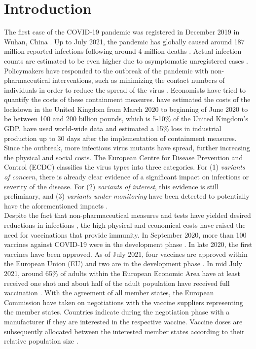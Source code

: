 \section{Introduction}
The first case of the COVID-19 pandemic was registered in December 2019 in Wuhan, China \citep{Hui.2020}. Up to July 2021, the pandemic has globally caused around 187 million reported infections following around 4 million deaths \citep{ecdc.2021a}. Actual infection counts are estimated to be even higher due to asymptomatic unregistered cases \citep{Byambasuren.2020}. Policymakers have responded to the outbreak of the pandemic with non-pharmaceutical interventions, such as minimizing the contact numbers of individuals in order to reduce the spread of the virus \citep{Gabler.2021}.  Economists have tried to quantify the costs of these containment measures. \cite{Miles.2020} have estimated the costs of the lockdown in the United Kingdom from March 2020 to beginning of June 2020 to be between 100 and 200 billion pounds, which is 5-10\% of the United Kingdom's GDP. \cite{Deb.2020} have used world-wide data and estimated a 15\% loss in industrial production up to 30 days after the implementation of containment measures. \\

Since the outbreak, more infectious virus mutants have spread, further increasing the physical and social costs. The European Centre for Disease Prevention and Control (ECDC) classifies the virus types into three categories. For (1) \textit{variants of concern}, there is already clear evidence of a significant impact on infections or severity of the disease. For (2) \textit{variants of interest}, this evidence is still preliminary, and (3) \textit{variants under monitoring} have been detected to potentially have the aforementioned impacts \citep{ecdc.2021b}. \\ 


Despite the fact that non-pharmaceutical measures and tests have yielded desired reductions in infections \citep{Gabler.2021}, the high physical and economical costs have raised the need for vaccinations that provide immunity.
In September 2020, more than 100 vaccines against COVID-19 were in the development phase \citep{Mullard.2020}. In late 2020, the first vaccines have been approved. As of July 2021, four vaccines are approved within the European Union (EU) and two are in the development phase \citep{ECa.2021}. In mid July 2021, around 65\% of adults within the European Economic Area have at least received one shot and about half of the adult population have received full vaccination \citep{ecdc.2021a}. With the agreement of all member states, the European Commission have taken on negotiations with the vaccine suppliers representing the member states. Countries indicate during the negotiation phase with a manufacturer if they are interested in the respective vaccine. Vaccine doses are subsequently allocated between the interested member states according to their relative population size \citep{ec.2021}. \\

